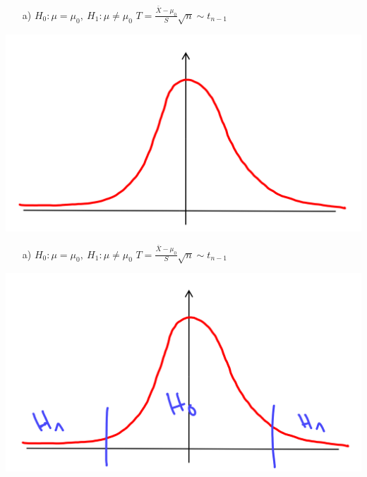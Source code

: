 \documentclass[t,11pt,aspectratio=169]{beamer}
\begin{document}
\begin{frame}
\begin{itemize}
\item[a)] $H_0:\mu=\mu_0,~H_1:\mu\neq\mu_0$ \hfill $T=\frac{\bar{X}-\mu_0}{S}\sqrt{n}\sim t_{n-1}$ \hfill
\end{itemize}
\begin{center}
\includegraphics[scale=0.4]{2.png}
\end{center}
\end{frame}

\begin{frame}
\begin{itemize}
\item[a)] $H_0:\mu=\mu_0,~H_1:\mu\neq\mu_0$ \hfill $T=\frac{\bar{X}-\mu_0}{S}\sqrt{n}\sim t_{n-1}$ \hfill
\end{itemize}
\begin{center}
\includegraphics[scale=0.4]{3.png}
\end{center}
\end{frame}
\end{document}
